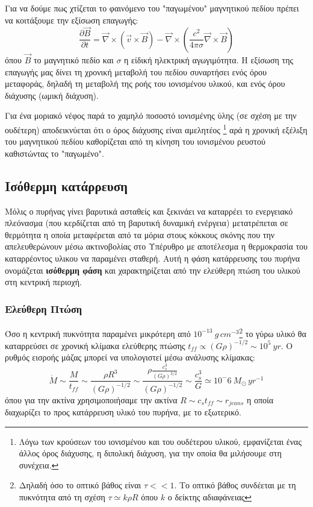 \documentclass[a4paper,12pt]{memoir}
\newcommand{\pt}[1]{\frac{\partial #1}{\partial t}}
\newcommand{\vv}{\vec{v}}
\newcommand{\bb}{\vec{B}}
\newcommand{\nn}{\vec{\nabla}}
\begin{document}
Για να δούμε πως χτίζεται το φαινόμενο του "παγωμένου" μαγνητικού πεδίου πρέπει να κοιτάξουμε την εξίσωση επαγωγής:
\begin{equation}
\pt{\bb} = \nn \times (\vv \times \bb) -\nn \times \left( \frac{c^2}{4 \pi \sigma} \nn \times \bb \right) 
\end{equation}
όπου  $\bb$ το μαγνητικό πεδίο και $\sigma$ η είδική ηλεκτρική αγωγιμότητα.
Η εξίσωση της επαγωγής μας δίνει τη χρονική μεταβολή του πεδίου συναρτήσει ενός όρου μεταφοράς, δηλαδή τη μεταβολή της ροής του ιονισμένου υλικού, και ενός όρου διάχυσης (ωμική διάχυση).

Για ένα μοριακό νέφος παρά το χαμηλό ποσοστό ιονισμένης ύλης (σε σχέση με την ουδέτερη) αποδεικνύεται ότι ο όρος διάχυσης είναι αμελητέος \footnote{Λόγω των κρούσεων του ιονισμένου και του ουδέτερου υλικού, εμφανίζεται ένας άλλος όρος διάχυσης, η διπολική διάχυση, για την οποία θα μιλήσουμε στη συνέχεια.} αρά η χρονική εξέλιξη του μαγνητικού πεδίου καθορίζεται από τη κίνηση του ιονισμένου ρευστού καθιστώντας το "παγωμένο".


\subsection{Ισόθερμη κατάρρευση}
Μόλις ο πυρήνας γίνει βαρυτικά ασταθείς και ξεκινάει να καταρρέει το ενεργειακό πλεόνασμα (που κερδίζεται από τη βαρυτική δυναμική ενέργεια) μετατρέπεται σε θερμότητα η οποία μεταφέρεται από τα μόρια στους κόκκους σκόνης που την απελευθερώνουν μέσω ακτινοβολίας στο Υπέρυθρο με αποτέλεσμα η θερμοκρασία του καταρρέοντος υλικου να παραμένει σταθερή. Αυτή η φάση κατάρρευσης του πυρήνα ονομάζεται \textbf{ισόθερμη φάση} και χαρακτηρίζεται από την ελεύθερη πτώση του υλικού στη κεντρική περιοχή.

\subsubsection{Ελεύθερη Πτώση}
Όσο η κεντρική πυκνότητα παραμένει μικρότερη από $10^{-13} \ g \, cm^{-3}$\footnote{Δηλαδή όσο το οπτικό βάθος είναι $\tau<<1$. Το οπτικό βάθος συνδέεται με τη πυκνότητα από τη σχέση $\tau \simeq k \rho R$ όπου $k$ ο δείκτης αδιαφάνειας} το γύρω υλικό θα καταρρεύσει σε χρονική κλίμακα ελεύθερης πτώσης $t_{ff} \propto (G \rho)^{-1/2} \sim 10^5 \ yr$. 
Ο ρυθμός εισροής μάζας μπορεί να υπολογιστεί μέσω ανάλυσης κλίμακας: 
\begin{equation}
\dot{M} \sim \frac{M}{t_{ff}} \sim \frac{\rho R^3}{(G \rho)^{-1/2}} \sim \frac{\rho \frac{c_s ^3}{(G \rho)^{3/2}}}{(G \rho)^{-1/2}} \sim \frac{c_s ^3}{G} \simeq 10^-6 \  M_{\odot} \, yr^{-1} 
\end{equation}
όπου για την ακτίνα χρησιμοποιήσαμε την ακτίνα $R \sim c_s t_{ff} \sim r_{jeans}$ η οποία διαχωρίζει το προς κατάρρευση υλικό του πυρήνα, με το εξωτερικό.
\end{document}
